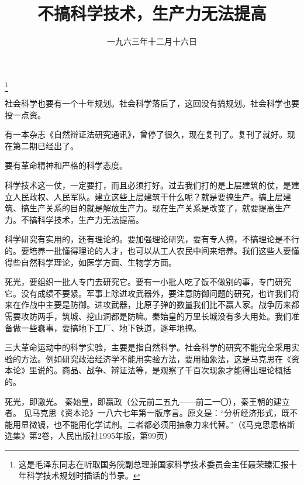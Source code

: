 
\title{不搞科学技术，生产力无法提高}
\date{一九六三年十二月十六日}
\thanks{这是毛泽东同志在听取国务院副总理兼国家科学技术委员会主任聂荣臻汇报十年科学技术规划时插话的节录。}
\maketitle


社会科学也要有一个十年规划。社会科学落后了，这回没有搞规划。社会科学也要投一点资。

有一本杂志《自然辩证法研究通讯》，曾停了很久，现在复刊了。复刊了就好。现在第二期已经出了。

要有革命精神和严格的科学态度。

科学技术这一仗，一定要打，而且必须打好。过去我们打的是上层建筑的仗，是建立人民政权、人民军队。建立这些上层建筑干什么呢？就是要搞生产。搞上层建筑、搞生产关系的目的就是解放生产力。现在生产关系是改变了，就要提高生产力。不搞科学技术，生产力无法提高。

科学研究有实用的，还有理论的。要加强理论研究，要有专人搞，不搞理论是不行的。要培养一批懂得理论的人才，也可以从工人农民中间来培养。我们这些人要懂得些自然科学理论，如医学方面、生物学方面。

死光，要组织一批人专门去研究它。要有一小批人吃了饭不做别的事，专门研究它。没有成绩不要紧。军事上除进攻武器外，要注意防御问题的研究，也许我们将来在作战中主要是防御。进攻武器，比原子弹的数量我们比不赢人家。战争历来都需要攻防两手，筑城、挖山洞都是防嘛。秦始皇的万里长城没有多大用处。我们准备做一些蠢事，要搞地下工厂、地下铁道，逐年地搞。

三大革命运动中的科学实验，主要是指自然科学。社会科学的研究不能完全采用实验的方法。例如研究政治经济学不能用实验方法，要用抽象法，这是马克思在《资本论》里说的。商品、战争、辩证法等，是观察了千百次现象才能得出理论概括的。

\begin{maonote}
死光，即激光。
秦始皇，即赢政（公元前二五九——前二一〇），秦王朝的建立者。
见马克思《资本论》一八六七年第一版序言。原文是：“分析经济形式，既不能用显微镜，也不能用化学试剂。二者都必须用抽象力来代替。”（《马克思恩格斯选集》第2卷，人民出版社1995年版，第99页）
\end{maonote}
